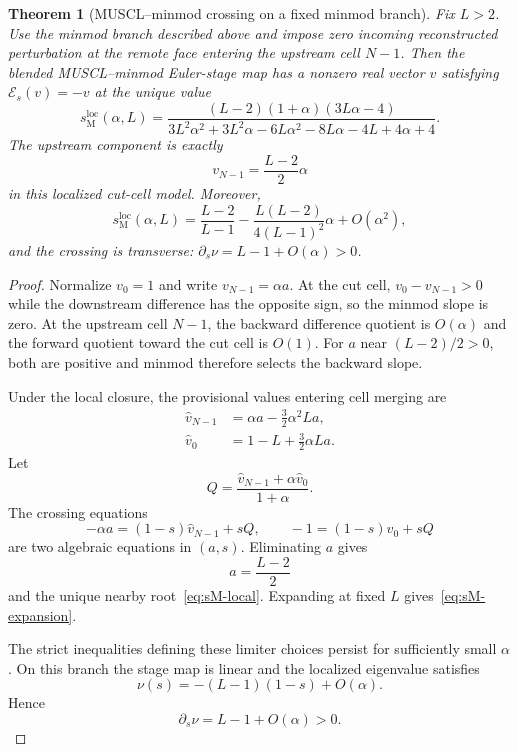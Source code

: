 \documentclass[preprint,12pt]{elsarticle}
\newtheorem{theorem}{Theorem}[section]
\begin{document}
\begin{theorem}[MUSCL--minmod crossing on a fixed minmod branch]
\label{thm:muscl-crossing}
Fix $L>2$.  Use the minmod branch described above and impose zero incoming
reconstructed perturbation at the remote face entering the upstream cell
$N-1$.  Then the blended MUSCL--minmod Euler-stage map has a nonzero real
vector $v$ satisfying $\mathcal E_s(v)=-v$ at the unique value
\begin{equation}
 s_{\mathrm M}^{\mathrm{loc}}(\alpha,L)
 =
 \frac{(L-2)(1+\alpha)(3L\alpha-4)}
 {3L^2\alpha^2+3L^2\alpha
 -6L\alpha^2-8L\alpha-4L+4\alpha+4}.
 \label{eq:sM-local}
\end{equation}
The upstream component is exactly
\begin{equation}
    v_{N-1}=\frac{L-2}{2}\alpha
    \label{eq:muscl-upstream-component}
\end{equation}
in this localized cut-cell model.  Moreover,
\begin{equation}
 s_{\mathrm M}^{\mathrm{loc}}(\alpha,L)
 =
 \frac{L-2}{L-1}
 -
 \frac{L(L-2)}{4(L-1)^2}\alpha
 +O(\alpha^2),
 \label{eq:sM-expansion}
\end{equation}
and the crossing is transverse:
$\partial_s\nu=L-1+O(\alpha)>0$.
\end{theorem}

\begin{proof}
Normalize $v_0=1$ and write $v_{N-1}=\alpha a$.  At the cut cell,
$v_0-v_{N-1}>0$ while the downstream difference has the opposite sign, so
the minmod slope is zero.  At the upstream cell $N-1$, the backward
difference quotient is $O(\alpha)$ and the forward quotient toward the cut
cell is $O(1)$.  For $a$ near $(L-2)/2>0$, both are positive and minmod
therefore selects the backward slope.

Under the local closure, the provisional values entering cell merging are
\begin{align}
    \widehat v_{N-1}
    &=
    \alpha a-\frac32\alpha^2La,
    \label{eq:muscl-vhat-left}\\
    \widehat v_0
    &=
    1-L+\frac32\alpha La.
    \label{eq:muscl-vhat-cut}
\end{align}
Let
\[
    Q=\frac{\widehat v_{N-1}+\alpha\widehat v_0}{1+\alpha}.
\]
The crossing equations
\begin{equation}
    -\alpha a=(1-s)\widehat v_{N-1}+sQ,
    \qquad
    -1=(1-s)\widehat v_0+sQ
    \label{eq:muscl-crossing-system}
\end{equation}
are two algebraic equations in $(a,s)$.  Eliminating $a$ gives
\[
    a=\frac{L-2}{2}
\]
and the unique nearby root~\eqref{eq:sM-local}.  Expanding at fixed $L$
gives~\eqref{eq:sM-expansion}.

The strict inequalities defining these limiter choices persist for sufficiently
small $\alpha$.  On this branch the stage map is linear and the localized
eigenvalue satisfies
\[
    \nu(s)=-(L-1)(1-s)+O(\alpha).
\]
Hence
\[
    \partial_s\nu=L-1+O(\alpha)>0.
\]
\end{proof}
\end{document}
